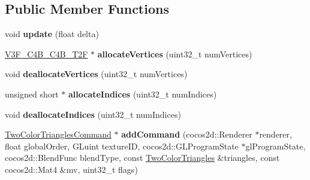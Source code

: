 \subsection*{Public Member Functions}
\begin{DoxyCompactItemize}
\item 
\mbox{\label{classspine_1_1SkeletonTwoColorBatch_a98a46d9f41700fe63c8f32bfae2d29a9}} 
void {\bfseries update} (float delta)
\item 
\mbox{\label{classspine_1_1SkeletonTwoColorBatch_a951b861ed46ff62b3cc9b063ff33a39b}} 
\hyperlink{structspine_1_1V3F__C4B__C4B__T2F}{V3\+F\+\_\+\+C4\+B\+\_\+\+C4\+B\+\_\+\+T2F} $\ast$ {\bfseries allocate\+Vertices} (uint32\+\_\+t num\+Vertices)
\item 
\mbox{\label{classspine_1_1SkeletonTwoColorBatch_a921f10e4f77a91e6f34d5132ce4c9d83}} 
void {\bfseries deallocate\+Vertices} (uint32\+\_\+t num\+Vertices)
\item 
\mbox{\label{classspine_1_1SkeletonTwoColorBatch_a1c5f60782c80e65d49c0a655057e2129}} 
unsigned short $\ast$ {\bfseries allocate\+Indices} (uint32\+\_\+t num\+Indices)
\item 
\mbox{\label{classspine_1_1SkeletonTwoColorBatch_a02ab0da69e18509acfe348a2fab974b1}} 
void {\bfseries deallocate\+Indices} (uint32\+\_\+t num\+Indices)
\item 
\mbox{\label{classspine_1_1SkeletonTwoColorBatch_af300233ab35785f9e67ffe7e693064e6}} 
\hyperlink{classspine_1_1TwoColorTrianglesCommand}{Two\+Color\+Triangles\+Command} $\ast$ {\bfseries add\+Command} (cocos2d\+::\+Renderer $\ast$renderer, float global\+Order, G\+Luint texture\+ID, cocos2d\+::\+G\+L\+Program\+State $\ast$gl\+Program\+State, cocos2d\+::\+Blend\+Func blend\+Type, const \hyperlink{structspine_1_1TwoColorTriangles}{Two\+Color\+Triangles} \&triangles, const cocos2d\+::\+Mat4 \&mv, uint32\+\_\+t flags)
\item 
\mbox{\label{classspine_1_1SkeletonTwoColorBatch_a16b68b02c879fd1a5f8dc8f79c1d1ac3}} 

\end{DoxyCompactItemize}
